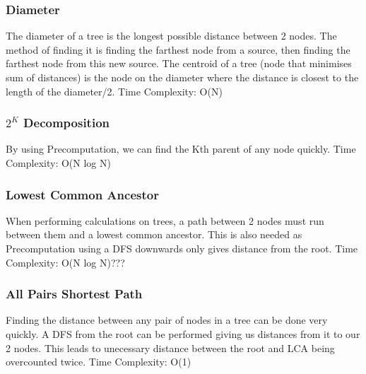 \documentclass{article}
\begin{document}
\subsubsection{Diameter}\begin{flushleft}
The diameter of a tree is the longest possible distance between 2 nodes.
The method of finding it is finding the farthest node from a source,
then finding the farthest node from this new source.
\newline
The centroid of a tree (node that minimises sum of distances) is the node
on the diameter where the distance is closest to the length of the diameter/2.
\newline
Time Complexity: O(N)
\end{flushleft}


\subsubsection{\texorpdfstring{$2^{K}$}{} Decomposition}\begin{flushleft}
By using Precomputation, we can find the Kth parent of any node quickly.
\newline
Time Complexity: O(N log N)
\end{flushleft}


\subsubsection{Lowest Common Ancestor}
\begin{flushleft}
When performing calculations on trees, a path between 2 nodes must
run between them and a lowest common ancestor. This is also needed
as Precomputation using a DFS downwards only gives distance from the root.
\newline
Time Complexity: O(N log N)???
\end{flushleft}


\subsubsection{All Pairs Shortest Path}
\begin{flushleft}
Finding the distance between any pair of nodes in a tree can be done very quickly.
A DFS from the root can be performed giving us distances from it to our 2 nodes.
This leads to unecessary distance between the root and LCA being overcounted twice.
\newline
Time Complexity: O(1)
\end{flushleft}

\end{document}
